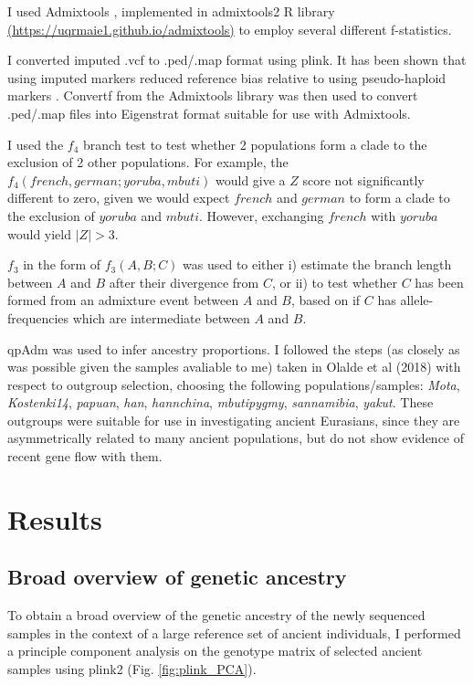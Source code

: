 I used Admixtools \cite{Patterson2012}, implemented in admixtools2 R library \url{(https://uqrmaie1.github.io/admixtools)} to employ several different f-statistics. 

I converted imputed .vcf to .ped/.map format using plink. It has been shown that using imputed markers reduced reference bias relative to using pseudo-haploid markers \cite{Martiniano2017}. Convertf from the Admixtools library was then used to convert .ped/.map files into Eigenstrat format suitable for use with Admixtools. 

I used the $f_{4}$ branch test to test whether 2 populations form a clade to the exclusion of 2 other populations. For example, the $f_{4}(french,german;yoruba,mbuti)$ would give a $Z$ score not significantly different to zero, given we would expect $french$ and $german$ to form a clade to the exclusion of $yoruba$ and $mbuti$. However, exchanging $french$ with $yoruba$ would yield $|Z| > 3$.

$f_{3}$ in the form of $f_{3}(A,B;C)$ was used to either i) estimate the branch length between $A$ and $B$ after their divergence from $C$, or ii) to test whether $C$ has been formed from an admixture event between $A$ and $B$, based on if $C$ has allele-frequencies which are intermediate between $A$ and $B$.

qpAdm was used to infer ancestry proportions. I followed the steps (as closely as was possible given the samples avaliable to me) taken in Olalde et al (2018) with respect to outgroup selection, choosing the following populations/samples: \textit{Mota}, \textit{Kostenki14}, \textit{papuan}, \textit{han}, \textit{hannchina}, \textit{mbutipygmy}, \textit{sannamibia}, \textit{yakut}. These outgroups were suitable for use in investigating ancient Eurasians, since they are asymmetrically related to many ancient populations, but do not show evidence of recent gene flow with them. 

\section{Results}

\subsection{Broad overview of genetic ancestry}

To obtain a broad overview of the genetic ancestry of the newly sequenced samples in the context of a large reference set of ancient individuals, I performed a principle component analysis on the genotype matrix of selected ancient samples using plink2 (Fig. \ref{fig:plink_PCA}). 

